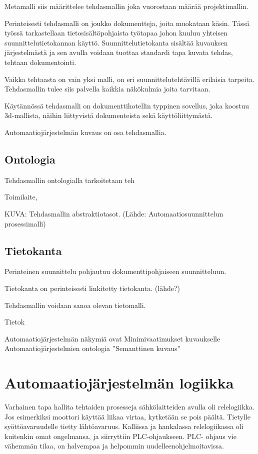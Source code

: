 \documentclass[finnish,12pt]{article}
\begin{document}
Metamalli siis määrittelee tehdasmallin joka vuorostaan määrää projektimallin.

Perinteisesti tehdasmalli on joukko dokumentteja, joita muokataan käsin.
Tässä työssä tarkastellaan tietosisältöpohjaista työtapaa johon kuuluu yhteisen suunnittelutietokannan käyttö.
Suunnittelutietokanta sisältää kuvauksen järjestelmästä ja sen avulla voidaan tuottaa standardi tapa kuvata tehdas, tehtaan dokumentointi.

Vaikka tehtaasta on vain yksi malli, on eri suunnittelutehtävillä erilaisia tarpeita.
Tehdasmallin tulee siis palvella kaikkia näkökulmia joita tarvitaan.

Käytännössä tehdasmalli on dokumenttihotellin typpinen sovellus, joka koostuu 3d-mallista, näihin liittyvistä dokumenteista sekä käyttöliittymästä.

Automaatiojärjestelmän kuvaus on osa tehdasmallia.

		\subsection{Ontologia}

Tehdasmallin ontologialla tarkoitetaan teh 

Toimilaite,


KUVA: Tehdasmallin abstraktiotasot. (Lähde: Automaatiosuunnittelun prosessimalli)

		\subsection{Tietokanta}

Perinteinen suunnittelu pohjautuu dokumenttipohjaiseen suunnitteluun.

Tietokanta on perinteisesti linkitetty tietokanta. (lähde?)

Tehdasmallin voidaan sanoa olevan tietomalli.

Tietok


Automaatiojärjestelmän näkymiä ovat
Minimivaatimukset kuvaukselle
Automaatiojärjestelmien ontologia
”Semanttinen kuvaus”

	\clearpage
	\section{Automaatiojärjestelmän logiikka}

Varhainen tapa hallita tehtaiden prosesseja sähkölaitteiden avulla oli relelogiikka.
Jos esimerkiksi moottori käyttää liikaa virtaa, kytketään se pois päältä.
Tietylle syöttöavaruudelle tietty lähtöavaruus.
Kalliissa ja hankalassa relelogiikassa oli kuitenkin omat ongelmansa, ja siirryttiin PLC-ohjaukseen.
PLC- ohjaus vie vähemmän tilaa, on halvempaa ja helpommin uudelleenohjelmoitavissa.
\end{document}
